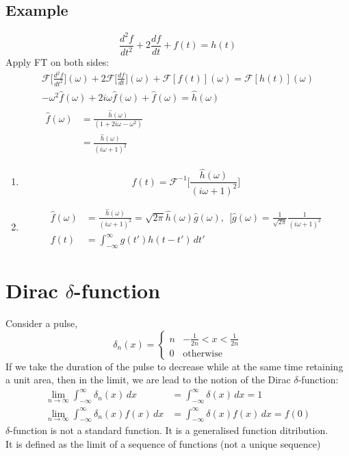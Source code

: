 \documentclass[a4paper, 11pt, normalem]{report}
\newcommand\ifnt{\int_{-\infty}^{\infty}}
\newcommand\F{\mathcal{F}}
\newcommand\om{\omega}
\begin{document}
\subsection{Example}
\begin{equation*}
    \frac{d^2 f}{dt^2} + 2\frac{df}{dt} + f(t) = h(t)
\end{equation*}
Apply FT on both sides:
\begin{gather*}
    \F\Big[\frac{d^2 f}{dt^2}\Big](\om) + 2\F\Big[\frac{df}{dt}\Big](\om) + \F[f(t)](\om) = \F[h(t)](\om) \\
    -\om^2 \hat{f}(\om) + 2i\om \hat{f}(\om) + \hat{f}(\om) = \hat{h}(\om) \\
    \begin{aligned}
        \hat{f}(\om) &= \frac{\hat{h}(\om)}{(1 + 2i\om - \om^2)} \\
        &= \frac{\hat{h}(\om)}{(i\om + 1)^2}
    \end{aligned}
\end{gather*}
\begin{enumerate}
    \item   \begin{equation*}
                f(t) = \F^{-1}\Bigg[\frac{\hat{h}(\om)}{(i\om + 1)^2}\Bigg]
            \end{equation*}
    \item   \begin{align*}
                \hat{f}(\om) &= \frac{\hat{h}(\om)}{(i\om + 1)^2} = \sqrt{2\pi}\hat{h}(\om) \hat{g}(\om),~~ \Big[\hat{g}(\om) = \frac{1}{\sqrt{2\pi}} \frac{1}{(i\om + 1)^2} \\
                f(t) &= \ifnt g(t')h(t - t')\,dt'
            \end{align*}
\end{enumerate}

\section{Dirac $\delta$-function}
Consider a pulse,
\begin{equation*}
    \delta_n (x) =  \begin{cases}
                        n & -\tfrac{1}{2n} < x < \tfrac{1}{2n} \\
                        0 & \text{otherwise}
                    \end{cases}
\end{equation*}
If we take the duration of the pulse to decrease while at the same time retaining a unit area, then in the limit, we are lead to the notion of the Dirac $\delta$-function:
\begin{align*}
    \lim_{n \to \infty} \ifnt \delta_n (x)\,dx &= \ifnt \delta(x)\,dx = 1 \\
    \lim_{n \to \infty} \ifnt \delta_n (x) f(x)\,dx &= \ifnt \delta(x)f(x)\,dx = f(0)
\end{align*}
$\delta$-function is not a standard function. It is a generalised function ditribution. \\
It is defined as the limit of a sequence of functions (not a unique sequence)
\end{document}
